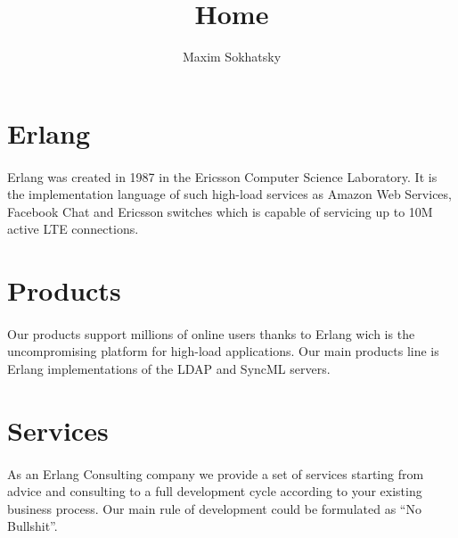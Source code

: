 \documentclass[11pt]{article}
\begin{document}

\title{Home}
\author{Maxim Sokhatsky}


\section*{Erlang}
\paragraph{}
Erlang was created in 1987 in the Ericsson Computer Science Laboratory.
It is the implementation language of such high-load services as Amazon Web Services,
Facebook Chat and Ericsson switches which is capable of servicing up to 10M active LTE connections.


\section*{Products}
\paragraph{}
Our products support millions of online users thanks to Erlang wich 
is the uncompromising platform for high-load applications. 
Our main products line is Erlang implementations of the LDAP and SyncML servers.

\section*{Services}
\paragraph{}
As an Erlang Consulting company we provide a set of services starting from advice 
and consulting to a full development cycle according to your existing business process. 
Our main rule of development could be formulated as ``No Bullshit''.
\end{document}
